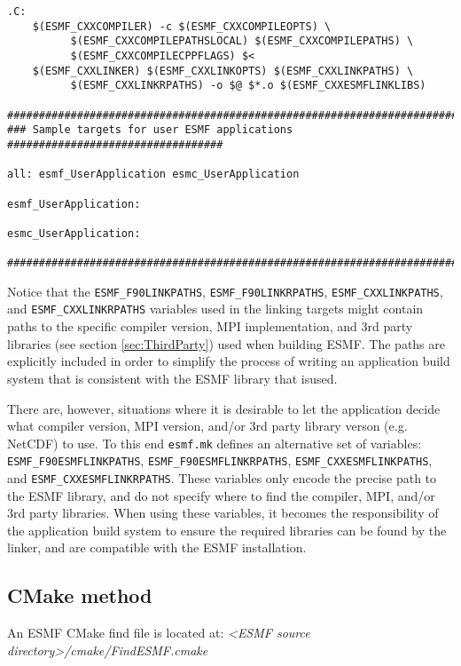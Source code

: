 \begin{verbatim}
.C:
	$(ESMF_CXXCOMPILER) -c $(ESMF_CXXCOMPILEOPTS) \
          $(ESMF_CXXCOMPILEPATHSLOCAL) $(ESMF_CXXCOMPILEPATHS) \
          $(ESMF_CXXCOMPILECPPFLAGS) $<
	$(ESMF_CXXLINKER) $(ESMF_CXXLINKOPTS) $(ESMF_CXXLINKPATHS) \
          $(ESMF_CXXLINKRPATHS) -o $@ $*.o $(ESMF_CXXESMFLINKLIBS)

################################################################################
### Sample targets for user ESMF applications ##################################

all: esmf_UserApplication esmc_UserApplication

esmf_UserApplication:

esmc_UserApplication:

################################################################################

\end{verbatim}

Notice that the {\tt ESMF\_F90LINKPATHS}, {\tt ESMF\_F90LINKRPATHS}, 
{\tt ESMF\_CXXLINKPATHS}, and {\tt ESMF\_CXXLINKRPATHS} variables used in the
linking targets might contain paths to the specific compiler version, MPI
implementation, and 3rd party libraries (see section \ref{sec:ThirdParty})
used when building ESMF. The paths are explicitly included in order to 
simplify the process of writing an application build system that is consistent
with the ESMF library that isused.

There are, however, situations where it is
desirable to let the application decide what compiler version, MPI version, 
and/or 3rd party library verson (e.g. NetCDF) to use. To this end {\tt esmf.mk}
defines an alternative set of variables: {\tt ESMF\_F90ESMFLINKPATHS}, 
{\tt ESMF\_F90ESMFLINKRPATHS}, {\tt ESMF\_CXXESMFLINKPATHS}, and 
{\tt ESMF\_CXXESMFLINKRPATHS}. These variables only encode the precise path to
the ESMF library, and do not specify where to find the compiler, MPI, and/or 
3rd party libraries. When using these variables, it becomes the responsibility
of the application build system to ensure the required libraries can be found
by the linker, and are compatible with the ESMF installation.


\subsection{CMake method}

An ESMF CMake find file is located at: \textit{<ESMF source directory>/cmake/FindESMF.cmake}

